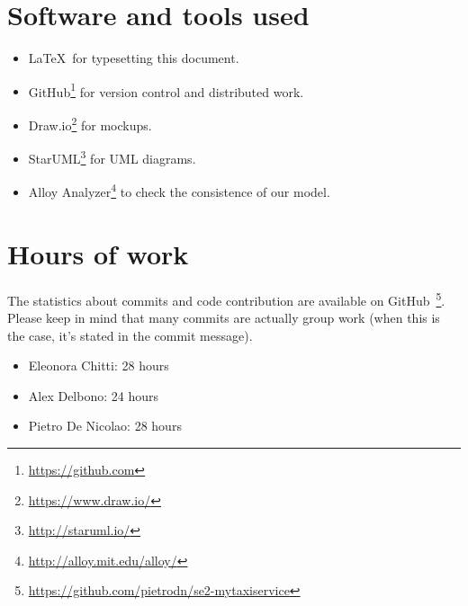 \section{Software and tools used}
\begin{itemize}
    \item \LaTeX\, for typesetting this document.
    \item GitHub\footnote{\url{https://github.com}} for version control and distributed work.
    \item Draw.io\footnote{\url{https://www.draw.io/}} for mockups.
    \item StarUML\footnote{\url{http://staruml.io/}} for UML diagrams.
    \item Alloy Analyzer\footnote{\url{http://alloy.mit.edu/alloy/}} to check the consistence of our model.
\end{itemize}

\section{Hours of work}
The statistics about commits and code contribution are available on GitHub~\footnote{\url{https://github.com/pietrodn/se2-mytaxiservice}}.
Please keep in mind that many commits are actually group work (when this is the case, it's stated in the commit message).

\begin{itemize}
    \item Eleonora Chitti: 28 hours
    \item Alex Delbono: 24 hours
    \item Pietro De Nicolao: 28 hours
\end{itemize}
